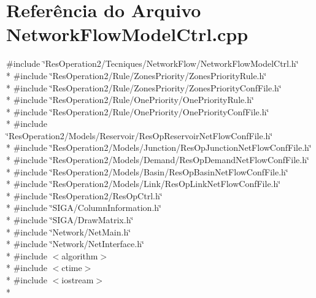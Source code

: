 \section{Referência do Arquivo Network\+Flow\+Model\+Ctrl.\+cpp}
\label{_network_flow_model_ctrl_8cpp}
{\ttfamily \#include \char`\"{}Res\+Operation2/\+Tecniques/\+Network\+Flow/\+Network\+Flow\+Model\+Ctrl.\+h\char`\"{}}\\*
{\ttfamily \#include \char`\"{}Res\+Operation2/\+Rule/\+Zones\+Priority/\+Zones\+Priority\+Rule.\+h\char`\"{}}\\*
{\ttfamily \#include \char`\"{}Res\+Operation2/\+Rule/\+Zones\+Priority/\+Zones\+Priority\+Conf\+File.\+h\char`\"{}}\\*
{\ttfamily \#include \char`\"{}Res\+Operation2/\+Rule/\+One\+Priority/\+One\+Priority\+Rule.\+h\char`\"{}}\\*
{\ttfamily \#include \char`\"{}Res\+Operation2/\+Rule/\+One\+Priority/\+One\+Priority\+Conf\+File.\+h\char`\"{}}\\*
{\ttfamily \#include \char`\"{}Res\+Operation2/\+Models/\+Reservoir/\+Res\+Op\+Reservoir\+Net\+Flow\+Conf\+File.\+h\char`\"{}}\\*
{\ttfamily \#include \char`\"{}Res\+Operation2/\+Models/\+Junction/\+Res\+Op\+Junction\+Net\+Flow\+Conf\+File.\+h\char`\"{}}\\*
{\ttfamily \#include \char`\"{}Res\+Operation2/\+Models/\+Demand/\+Res\+Op\+Demand\+Net\+Flow\+Conf\+File.\+h\char`\"{}}\\*
{\ttfamily \#include \char`\"{}Res\+Operation2/\+Models/\+Basin/\+Res\+Op\+Basin\+Net\+Flow\+Conf\+File.\+h\char`\"{}}\\*
{\ttfamily \#include \char`\"{}Res\+Operation2/\+Models/\+Link/\+Res\+Op\+Link\+Net\+Flow\+Conf\+File.\+h\char`\"{}}\\*
{\ttfamily \#include \char`\"{}Res\+Operation2/\+Res\+Op\+Ctrl.\+h\char`\"{}}\\*
{\ttfamily \#include \char`\"{}S\+I\+G\+A/\+Column\+Information.\+h\char`\"{}}\\*
{\ttfamily \#include \char`\"{}S\+I\+G\+A/\+Draw\+Matrix.\+h\char`\"{}}\\*
{\ttfamily \#include \char`\"{}Network/\+Net\+Main.\+h\char`\"{}}\\*
{\ttfamily \#include \char`\"{}Network/\+Net\+Interface.\+h\char`\"{}}\\*
{\ttfamily \#include $<$algorithm$>$}\\*
{\ttfamily \#include $<$ctime$>$}\\*
{\ttfamily \#include $<$iostream$>$}\\*
